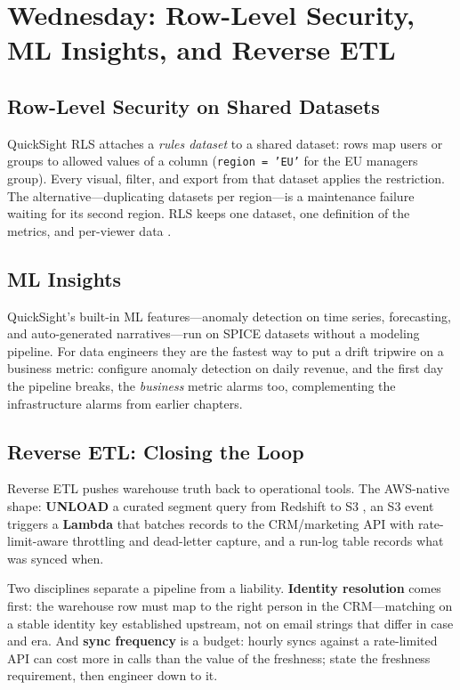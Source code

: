 \section{Wednesday: Row-Level Security, ML Insights, and Reverse ETL}
\subsection{Row-Level Security on Shared Datasets}
QuickSight RLS attaches a \emph{rules dataset} to a shared dataset: rows map users or groups to allowed values of a column (\texttt{region = 'EU'} for the EU managers group). Every visual, filter, and export from that dataset applies the restriction. The alternative---duplicating datasets per region---is a maintenance failure waiting for its second region. RLS keeps one dataset, one definition of the metrics, and per-viewer data \cite{awsQuickSightDocs}.

\subsection{ML Insights}
QuickSight's built-in ML features---anomaly detection on time series, forecasting, and auto-generated narratives---run on SPICE datasets without a modeling pipeline. For data engineers they are the fastest way to put a drift tripwire on a business metric: configure anomaly detection on daily revenue, and the first day the pipeline breaks, the \emph{business} metric alarms too, complementing the infrastructure alarms from earlier chapters.

\subsection{Reverse ETL: Closing the Loop}
Reverse ETL pushes warehouse truth back to operational tools. The AWS-native shape: \textbf{UNLOAD} a curated segment query from Redshift to S3 \cite{awsRedshiftUNLOAD}, an S3 event triggers a \textbf{Lambda} that batches records to the CRM/marketing API with rate-limit-aware throttling and dead-letter capture, and a run-log table records what was synced when.

Two disciplines separate a pipeline from a liability. \textbf{Identity resolution} comes first: the warehouse row must map to the right person in the CRM---matching on a stable identity key established upstream, not on email strings that differ in case and era. And \textbf{sync frequency} is a budget: hourly syncs against a rate-limited API can cost more in calls than the value of the freshness; state the freshness requirement, then engineer down to it.

